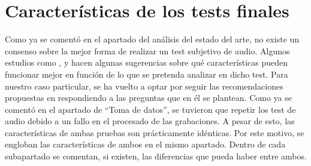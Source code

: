 \documentclass[11pt,a4paper,twoside]{book}
\begin{document}
        \section{Características de los tests finales}
            Como ya se comentó en el apartado del análisis del estado del arte, no existe un consenso sobre la mejor forma de realizar un test subjetivo de audio. Algunos estudios como \cite{Tejada2020}, \cite{delaPrida2019} y \cite{delaPrida2021} hacen algunas sugerencias sobre qué características pueden funcionar mejor en función de lo que se pretenda analizar en dicho test. Para nuestro caso particular, se ha vuelto a optar por seguir las recomendaciones propuestas en \cite{Tejada2020} respondiendo a las preguntas que en él se plantean. Como ya se comentó en el apartado de ``Toma de datos'', se tuvieron que repetir los test de audio debido a un fallo en el procesado de las grabaciones. A pesar de esto, las características de ambas pruebas son prácticamente idénticas. Por este motivo, se engloban las características de ambos en el mismo apartado. Dentro de cada subapartado se comentan, si existen, las diferencias que pueda haber entre ambos.
            
\end{document}
